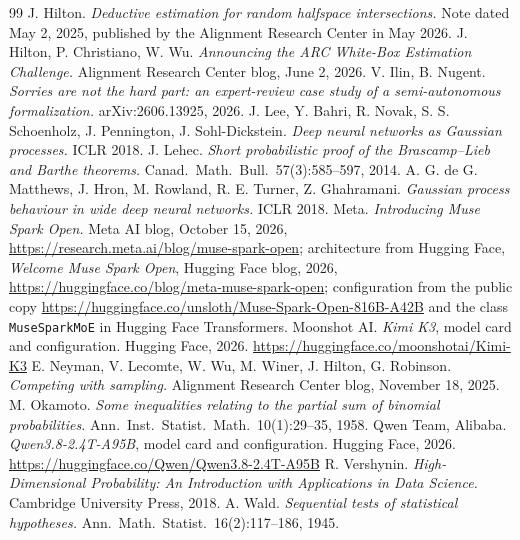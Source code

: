 \documentclass[10pt]{article}
\begin{document}
\begin{thebibliography}{99}
 J. Hilton. \emph{Deductive estimation for random halfspace intersections.} Note dated May 2, 2025, published by the Alignment Research Center in May 2026.
 J. Hilton, P. Christiano, W. Wu. \emph{Announcing the ARC White-Box Estimation Challenge.} Alignment Research Center blog, June 2, 2026.
 V. Ilin, B. Nugent. \emph{Sorries are not the hard part: an expert-review case study of a semi-autonomous formalization.} arXiv:2606.13925, 2026.
 J. Lee, Y. Bahri, R. Novak, S. S. Schoenholz, J. Pennington, J. Sohl-Dickstein. \emph{Deep neural networks as Gaussian processes.} ICLR 2018.
 J. Lehec. \emph{Short probabilistic proof of the Brascamp--Lieb and Barthe theorems.} Canad.\ Math.\ Bull.\ 57(3):585--597, 2014.
 A. G. de G. Matthews, J. Hron, M. Rowland, R. E. Turner, Z. Ghahramani. \emph{Gaussian process behaviour in wide deep neural networks.} ICLR 2018.
 Meta. \emph{Introducing Muse Spark Open.} Meta AI blog, October 15, 2026, \url{https://research.meta.ai/blog/muse-spark-open}; architecture from Hugging Face, \emph{Welcome Muse Spark Open}, Hugging Face blog, 2026, \url{https://huggingface.co/blog/meta-muse-spark-open}; configuration from the public copy \url{https://huggingface.co/unsloth/Muse-Spark-Open-816B-A42B} and the class \texttt{MuseSparkMoE} in Hugging Face Transformers.
 Moonshot AI. \emph{Kimi K3}, model card and configuration. Hugging Face, 2026. \url{https://huggingface.co/moonshotai/Kimi-K3}
 E. Neyman, V. Lecomte, W. Wu, M. Winer, J. Hilton, G. Robinson. \emph{Competing with sampling.} Alignment Research Center blog, November 18, 2025.
 M. Okamoto. \emph{Some inequalities relating to the partial sum of binomial probabilities.} Ann.\ Inst.\ Statist.\ Math.\ 10(1):29--35, 1958.
 Qwen Team, Alibaba. \emph{Qwen3.8-2.4T-A95B}, model card and configuration. Hugging Face, 2026. \url{https://huggingface.co/Qwen/Qwen3.8-2.4T-A95B}
 R. Vershynin. \emph{High-Dimensional Probability: An Introduction with Applications in Data Science.} Cambridge University Press, 2018.
 A. Wald. \emph{Sequential tests of statistical hypotheses.} Ann.\ Math.\ Statist.\ 16(2):117--186, 1945.

\end{thebibliography}
\end{document}
